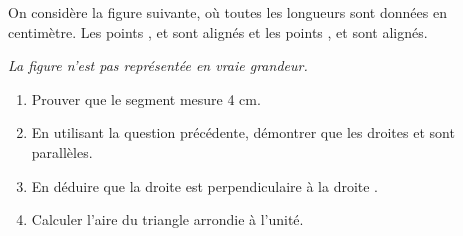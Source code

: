 \documentclass[exercice,a4]{thedocument}%
\begin{document}
%
    On considère la figure suivante, où toutes les longueurs sont données en
    centimètre. Les points ,  et 
    sont alignés et les points ,  et 
    sont alignés.\par\smallskip\noindent
    \textit{La figure n'est pas représentée en vraie grandeur.}
    \par\medskip\noindent
    \begin{minipage}{0.45\linewidth}
    \begin{enumerate}
        \item Prouver que le segment \mathspoint{[AB]} mesure 4 cm.
        \item En utilisant la question précédente, démontrer que les droites
             et  sont parallèles.
        \item En déduire que la droite  est perpendiculaire
            à la droite .
        \item Calculer l'aire du triangle  arrondie à l'unité.
        \end{enumerate}
    \end{minipage}\hfill
    \begin{minipage}{0.5\linewidth}
    \end{minipage}\par
    \showthesource
\end{document}
